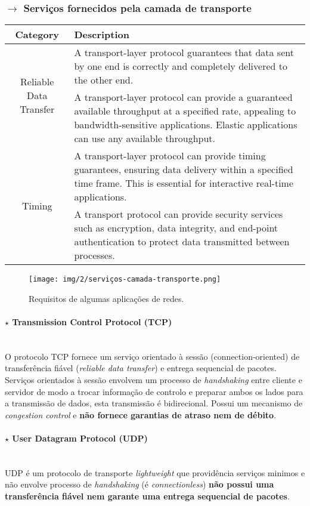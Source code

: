 \subsubsection[2.1.5 Serviços fornecidos pela camada de transporte ]{$\pmb{\rightarrow}$ Serviços fornecidos pela camada de transporte}
\begin{tabular}{|c|p{11cm}|}
\hline
\textbf{Category} & \textbf{Description} \\
\hline
\multirow{2}{*}{Reliable Data Transfer} & A transport-layer protocol guarantees that data sent by one end is correctly and completely delivered to the other end. \\
\hline
\multirow{4}{*}{Throughput} & A transport-layer protocol can provide a guaranteed available throughput at a specified rate, appealing to bandwidth-sensitive applications. Elastic applications can use any available throughput. \\
\hline
\multirow{3}{*}{Timing} & A transport-layer protocol can provide timing guarantees, ensuring data delivery within a specified time frame. This is essential for interactive real-time applications. \\
\hline
\multirow{3}{*}{Security} & A transport protocol can provide security services such as encryption, data integrity, and end-point authentication to protect data transmitted between processes. \\
\hline
\end{tabular}

\begin{figure}[H]
    \centering
    \texttt{[image: img/2/serviços-camada-transporte.png]}
    \caption{Requisitos de algumas aplicações de redes.\cite{Kurose2017}}
    \label{fig:serviços-camada-transporte}
\end{figure}

\paragraph[2.1.5.1 Transmission Control Protocol (TCP)]{$\pmb{\star}$ Transmission Control Protocol (TCP)}\mbox{}\\[4pt]
\noindent O protocolo TCP fornece um serviço orientado à sessão (connection-oriented) de transferência fiável (\textit{reliable data transfer}) e entrega sequencial de pacotes. Serviços orientados à sessão envolvem um processo de \textit{handshaking} entre cliente e servidor de modo a trocar informação de controlo e preparar ambos os lados para a transmissão de dados, esta transmissão é bidirecional. Possui um mecanismo de \textit{congestion control} e \textbf{não fornece garantias de atraso nem de débito}.

\paragraph[2.1.5.2 User Datagram Protocol (UDP)]{$\pmb{\star}$ User Datagram Protocol (UDP)}\mbox{}\\[4pt]
\noindent UDP é um protocolo de transporte \textit{lightweight} que providência serviços minimos e não envolve processo de \textit{handshaking} (é \textit{connectionless}) \textbf{não possui uma transferência fiável nem garante uma entrega sequencial de pacotes}.
